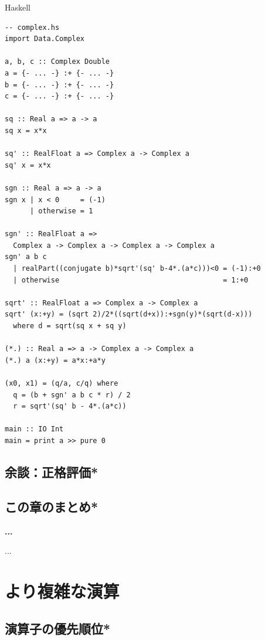 \documentclass[a5paper,twoside,fleqn,draft]{jsbook}
\newcommand{\programminglanguage}[1]{\textsf{#1}}
\newcommand{\haskell}{\programminglanguage{Haskell}}
\newenvironment{note}[1]{\begin{boxnote}\begin{center}\textbf{#1}\end{center}}{\end{boxnote}}
\newenvironment{haskellcode}{\begin{itembox}[r]{\haskell}}{\end{itembox}}
\begin{document}
\begin{haskellcode}
\begin{verbatim}
-- complex.hs
import Data.Complex

a, b, c :: Complex Double
a = {- ... -} :+ {- ... -}
b = {- ... -} :+ {- ... -}
c = {- ... -} :+ {- ... -}

sq :: Real a => a -> a
sq x = x*x

sq' :: RealFloat a => Complex a -> Complex a
sq' x = x*x

sgn :: Real a => a -> a
sgn x | x < 0     = (-1)
      | otherwise = 1

sgn' :: RealFloat a =>
  Complex a -> Complex a -> Complex a -> Complex a
sgn' a b c
  | realPart((conjugate b)*sqrt'(sq' b-4*.(a*c)))<0 = (-1):+0
  | otherwise                                       = 1:+0

sqrt' :: RealFloat a => Complex a -> Complex a
sqrt' (x:+y) = (sqrt 2)/2*((sqrt(d+x)):+sgn(y)*(sqrt(d-x)))
  where d = sqrt(sq x + sq y)

(*.) :: Real a => a -> Complex a -> Complex a
(*.) a (x:+y) = a*x:+a*y

(x0, x1) = (q/a, c/q) where
  q = (b + sgn' a b c * r) / 2
  r = sqrt'(sq' b - 4*.(a*c))

main :: IO Int
main = print a >> pure 0
\end{verbatim}
\end{haskellcode}

\section{余談：正格評価*}


\section{この章のまとめ*}

\begin{note}{...}
...
\end{note}

\chapter{より複雑な演算}

\section{演算子の優先順位*}
\end{document}
